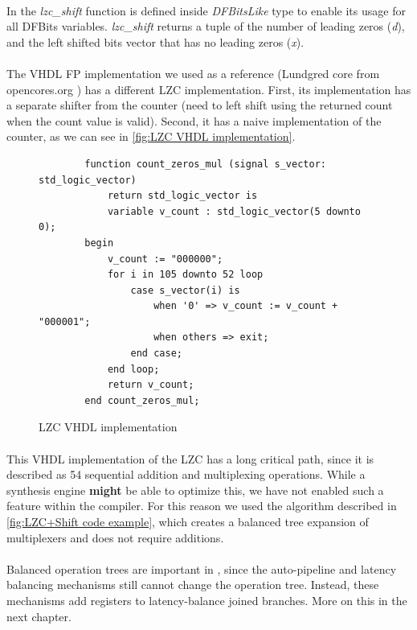 \paragraph{}In \cf the \textit{lzc\_shift} function is defined inside \textit{DFBitsLike} type to enable its usage for all DFBits variables. \textit{lzc\_shift} returns a tuple of the number of leading zeros (\textit{d}), and the left shifted bits vector that has no leading zeros (\textit{x}).

\paragraph{}The VHDL FP implementation we used as a reference (Lundgred core from opencores.org \cite{lundgren2014open}) has a different LZC implementation. First, its implementation has a separate shifter from the counter (need to left shift using the returned count when the count value is valid). Second, it has a naive implementation of the counter, as we can see in \autoref{fig:LZC VHDL implementation}.

\begin{figure}[h]
	\centering
	\begin{verbatim}
		function count_zeros_mul (signal s_vector: std_logic_vector) 
			return std_logic_vector is
			variable v_count : std_logic_vector(5 downto 0);	
		begin
			v_count := "000000";
			for i in 105 downto 52 loop
				case s_vector(i) is
					when '0' => v_count := v_count + "000001";
					when others => exit;
				end case;
			end loop;
			return v_count;	
		end count_zeros_mul;
		\end{verbatim}
	\caption{LZC VHDL implementation}\label{fig:LZC VHDL implementation}
\end{figure}

\paragraph{}This VHDL implementation of the LZC has a long critical path, since it is described as 54 sequential addition and multiplexing operations. While a synthesis engine \textbf{might} be able to optimize this, we have not enabled such a feature within the \cf compiler. For this reason we used the algorithm described in \autoref{fig:LZC+Shift code example}, which creates a balanced tree expansion of multiplexers and does not require additions. 

\paragraph{}Balanced operation trees are important in \cfns, since the auto-pipeline and latency balancing mechanisms still cannot change the operation tree. Instead, these mechanisms add registers to latency-balance joined branches. More on this in the next chapter.


